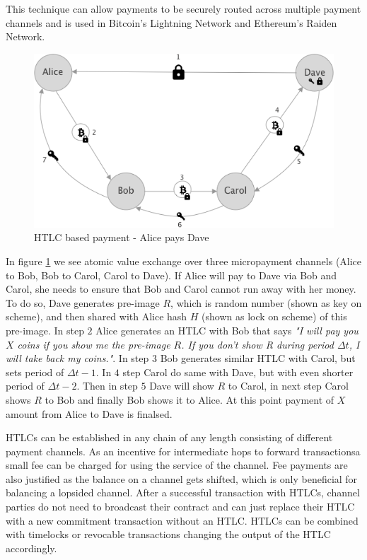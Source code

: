 \documentclass[a4paper,12pt]{article}
\begin{document}
This technique can allow payments to be securely routed across multiple payment 
channels and is used in Bitcoin's Lightning Network and Ethereum's Raiden 
Network.

\begin{figure}[H]
    \centering
    \includegraphics[scale=0.5]{../img/htlc}
    \caption{HTLC based payment - Alice pays Dave}
    \label{img:htlc}
\end{figure}

In figure \ref{img:htlc} we see atomic value exchange over three micropayment 
channels (Alice to Bob, Bob to Carol, Carol to Dave). If Alice will pay to Dave
via Bob and Carol, she needs to ensure that Bob and Carol cannot run away with 
her money. To do so, Dave generates pre-image $R$, which is random number (shown 
as key on scheme), and then shared with Alice hash $H$ (shown as lock on scheme) 
of this pre-image. In step $2$ Alice generates an HTLC with Bob that says 
\textit{"I will pay you $X$ coins if you show me the pre-image $R$. If you don't 
show R during period $\Delta t$, I will take back my coins."}. In step $3$ Bob 
generates similar HTLC with Carol, but sets period of $\Delta t - 1$. In $4$ step 
Carol do same with Dave, but with even shorter period of $\Delta t - 2$. Then in 
step $5$ Dave will show $R$ to Carol, in next step Carol shows $R$ to Bob and 
finally Bob shows it to Alice. At this point payment of $X$ amount from Alice to 
Dave is finalsed.

HTLCs can be established in any chain of any length consisting of different 
payment channels. As an incentive for intermediate hops to forward transactionsa 
small fee can be charged for using the service of the channel. Fee payments are 
also justified as the balance on a channel gets shifted, which is only beneficial 
for balancing a lopsided channel. After a successful transaction with HTLCs, 
channel parties do not need to broadcast their contract and can just replace their
HTLC with a new commitment transaction without an HTLC. HTLCs can be combined with 
timelocks or revocable transactions changing the output of the HTLC accordingly.\\
\end{document}
